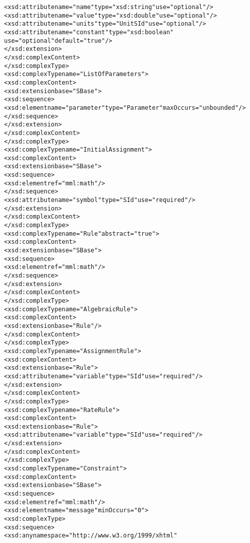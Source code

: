\begin{alltt}
                <xsd:attribute name="name" type="xsd:string" use="optional"/>
                <xsd:attribute name="value" type="xsd:double" use="optional"/>
                <xsd:attribute name="units" type="UnitSId" use="optional"/>
                <xsd:attribute name="constant" type="xsd:boolean" 
                               use="optional" default="true"/>
            </xsd:extension>
        </xsd:complexContent>
    </xsd:complexType>
    <xsd:complexType name="ListOfParameters">
        <xsd:complexContent>
            <xsd:extension base="SBase">
                <xsd:sequence>
                    <xsd:element name="parameter" type="Parameter" maxOccurs="unbounded"/>
                </xsd:sequence>
            </xsd:extension>
        </xsd:complexContent>
    </xsd:complexType>
    <xsd:complexType name="InitialAssignment">
        <xsd:complexContent>
            <xsd:extension base="SBase">
                <xsd:sequence>
                    <xsd:element ref="mml:math"/>
                </xsd:sequence>
                <xsd:attribute name="symbol" type="SId" use="required"/>
            </xsd:extension>
        </xsd:complexContent>
    </xsd:complexType>
    <xsd:complexType name="Rule" abstract="true">
        <xsd:complexContent>
            <xsd:extension base="SBase">
                <xsd:sequence>
                    <xsd:element ref="mml:math"/>
                </xsd:sequence>
            </xsd:extension>
        </xsd:complexContent>
    </xsd:complexType>
    <xsd:complexType name="AlgebraicRule">
        <xsd:complexContent>
            <xsd:extension base="Rule"/>
        </xsd:complexContent>
    </xsd:complexType>
    <xsd:complexType name="AssignmentRule">
        <xsd:complexContent>
            <xsd:extension base="Rule">
                <xsd:attribute name="variable" type="SId" use="required"/>
            </xsd:extension>
        </xsd:complexContent>
    </xsd:complexType>
    <xsd:complexType name="RateRule">
        <xsd:complexContent>
            <xsd:extension base="Rule">
                <xsd:attribute name="variable" type="SId" use="required"/>
            </xsd:extension>
        </xsd:complexContent>
    </xsd:complexType>
    <xsd:complexType name="Constraint">
        <xsd:complexContent>
            <xsd:extension base="SBase">
                <xsd:sequence>
                    <xsd:element ref="mml:math"/>
                    <xsd:element name="message" minOccurs="0">
                        <xsd:complexType>
                            <xsd:sequence>
                                <xsd:any namespace="http://www.w3.org/1999/xhtml" 

\end{alltt}
